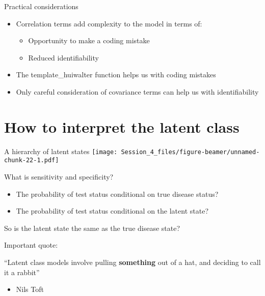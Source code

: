 \documentclass[
  ignorenonframetext,
  aspectratio=169,
]{beamer}
\providecommand{\tightlist}{%
  \setlength{\itemsep}{0pt}\setlength{\parskip}{0pt}}
\begin{document}
\begin{frame}{Practical considerations}
\protect\hypertarget{practical-considerations}{}
\begin{itemize}
\tightlist
\item
  Correlation terms add complexity to the model in terms of:

  \begin{itemize}
  \tightlist
  \item
    Opportunity to make a coding mistake
  \item
    Reduced identifiability
  \end{itemize}
\end{itemize}

\pause

\begin{itemize}
\item
  The template\_huiwalter function helps us with coding mistakes
\item
  Only careful consideration of covariance terms can help us with
  identifiability
\end{itemize}
\end{frame}

\hypertarget{how-to-interpret-the-latent-class}{%
\section{How to interpret the latent
class}\label{how-to-interpret-the-latent-class}}

\begin{frame}{A hierarchy of latent states}
\protect\hypertarget{a-hierarchy-of-latent-states}{}
\scriptsize\texttt{[image: Session\_4\_files/figure-beamer/unnamed-chunk-22-1.pdf]}
\normalsize
\end{frame}

\begin{frame}{What is sensitivity and specificity?}
\protect\hypertarget{what-is-sensitivity-and-specificity}{}
\begin{itemize}
\item
  The probability of test status conditional on true disease status?
\item
  The probability of test status conditional on the latent state?
\end{itemize}

\pause

So is the latent state the same as the true disease state?

\pause

Important quote:

``Latent class models involve pulling \textbf{something} out of a hat,
and deciding to call it a rabbit''

\begin{itemize}
\tightlist
\item
  Nils Toft
\end{itemize}
\end{frame}
\end{document}
